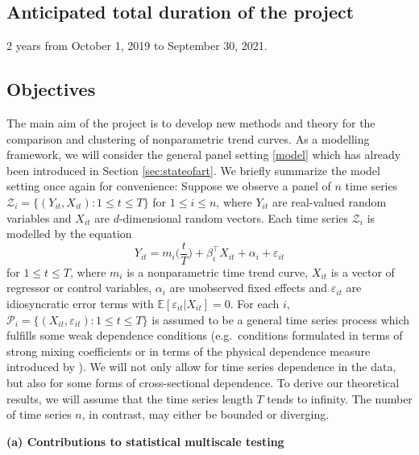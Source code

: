 \documentclass[a4paper,12pt]{article}
\begin{document}
\subsection{Anticipated total duration of the project}


2 years from October 1, 2019 to September 30, 2021.


\subsection{Objectives}\label{sec:objectives}


The main aim of the project is to develop new methods and theory for the comparison and clustering of nonparametric trend curves. As a modelling framework, we will consider the general panel setting \eqref{model} which has already been introduced in Section \ref{sec:stateofart}. We briefly summarize the model setting once again for convenience: Suppose we observe a panel of $n$ time series $\mathcal{Z}_i = \{(Y_{it},X_{it}): 1 \le t \le T\}$ for $ 1 \le i \le n$, where $Y_{it}$ are real-valued random variables and $X_{it}$ are $d$-dimensional random vectors. Each time series $\mathcal{Z}_i$ is modelled by the equation 
\begin{equation}\label{model-objectives}
Y_{it} = m_i \Big( \frac{t}{T} \Big) + \beta_i^\top X_{it} + \alpha_i + \varepsilon_{it} 
\end{equation}
for $ 1 \le t \le T$, where $m_i$ is a nonparametric time trend curve, $X_{it}$ is a vector of regressor or control variables, $\alpha_i$ are unobserved fixed effects and $\varepsilon_{it}$ are idiosyncratic error terms with $\mathbb{E}[\varepsilon_{it}|X_{it} ] = 0$. For each $i$, $\mathcal{P}_i = \{(X_{it},\varepsilon_{it}): 1 \le t \le T\}$ is assumed to be a general time series process which fulfills some weak dependence conditions (e.g.\ conditions formulated in terms of strong mixing coefficients or in terms of the physical dependence measure introduced by \cite{Wu2005}). We will not only allow for time series dependence in the data, but also for some forms of cross-sectional dependence. To derive our theoretical results, we will assume that the time series length $T$ tends to infinity. The number of time series $n$, in contrast, may either be bounded or diverging. 
\vspace{15pt}


\noindent \textbf{(a) Contributions to statistical multiscale testing} 
\vspace{10pt} 
\end{document}
